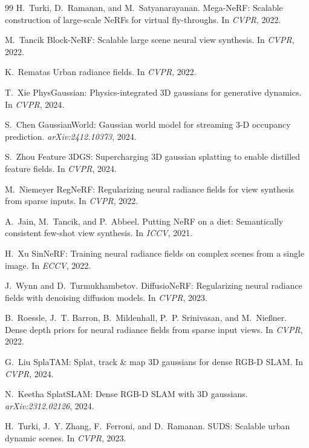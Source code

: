 \begin{thebibliography}{99}
H.~Turki, D.~Ramanan, and M.~Satyanarayanan.
{Mega-NeRF}: Scalable construction of large-scale {NeRFs} for virtual
fly-throughs.
In \emph{CVPR}, 2022.

M.~Tancik \etal
{Block-NeRF}: Scalable large scene neural view synthesis.
In \emph{CVPR}, 2022.

K.~Rematas \etal
Urban radiance fields.
In \emph{CVPR}, 2022.

T.~Xie \etal
{PhysGaussian}: Physics-integrated 3{D} gaussians for generative dynamics.
In \emph{CVPR}, 2024.

S.~Chen \etal
{GaussianWorld}: Gaussian world model for streaming 3-D occupancy prediction.
\emph{arXiv:2412.10373}, 2024.

S.~Zhou \etal
{Feature 3DGS}: Supercharging 3{D} gaussian splatting to enable distilled
feature fields.
In \emph{CVPR}, 2024.

M.~Niemeyer \etal
{RegNeRF}: Regularizing neural radiance fields for view synthesis from
sparse inputs.
In \emph{CVPR}, 2022.

A.~Jain, M.~Tancik, and P.~Abbeel.
Putting {NeRF} on a diet: Semantically consistent few-shot view synthesis.
In \emph{ICCV}, 2021.

H.~Xu \etal
{SinNeRF}: Training neural radiance fields on complex scenes from a single
image.
In \emph{ECCV}, 2022.

J.~Wynn and D.~Turmukhambetov.
{DiffusioNeRF}: Regularizing neural radiance fields with denoising diffusion
models.
In \emph{CVPR}, 2023.

B.~Roessle, J.~T. Barron, B.~Mildenhall, P.~P. Srinivasan, and
M.~Nie{\ss}ner.
Dense depth priors for neural radiance fields from sparse input views.
In \emph{CVPR}, 2022.

G.~Liu \etal
{SplaTAM}: Splat, track \& map 3{D} gaussians for dense {RGB-D SLAM}.
In \emph{CVPR}, 2024.

N.~Keetha \etal
{SplatSLAM}: Dense {RGB-D SLAM} with 3{D} gaussians.
\emph{arXiv:2312.02126}, 2024.

H.~Turki, J.~Y. Zhang, F.~Ferroni, and D.~Ramanan.
{SUDS}: Scalable urban dynamic scenes.
In \emph{CVPR}, 2023.



\end{thebibliography}
